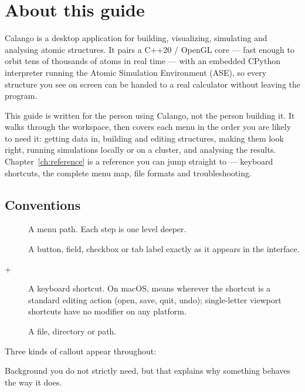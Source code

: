 \chapter*{About this guide}

Calango is a desktop application for building, visualizing, simulating and
analysing atomic structures. It pairs a C++20 / OpenGL core --- fast enough
to orbit tens of thousands of atoms in real time --- with an embedded
CPython interpreter running the Atomic Simulation Environment (ASE), so
every structure you see on screen can be handed to a real calculator
without leaving the program.

This guide is written for the person using Calango, not the person
building it. It walks through the workspace, then covers each menu in the
order you are likely to need it: getting data in, building and editing
structures, making them look right, running simulations locally or on a
cluster, and analysing the results. Chapter~\ref{ch:reference} is a
reference you can jump straight to --- keyboard shortcuts, the complete
menu map, file formats and troubleshooting.

\section*{Conventions}

\begin{description}
  \item[\menusep{}] A menu path. Each
    \menusep{} step is one level deeper.
  \item[] A button, field, checkbox or tab label exactly as it
    appears in the interface.
  \item[+] A keyboard shortcut. On macOS, 
    means  wherever the shortcut is a standard editing action
    (open, save, quit, undo); single-letter viewport shortcuts have no
    modifier on any platform.
  \item[] A file, directory or path.
\end{description}

Three kinds of callout appear throughout:

\begin{calnote}
Background you do not strictly need, but that explains why something
behaves the way it does.
\end{calnote}

